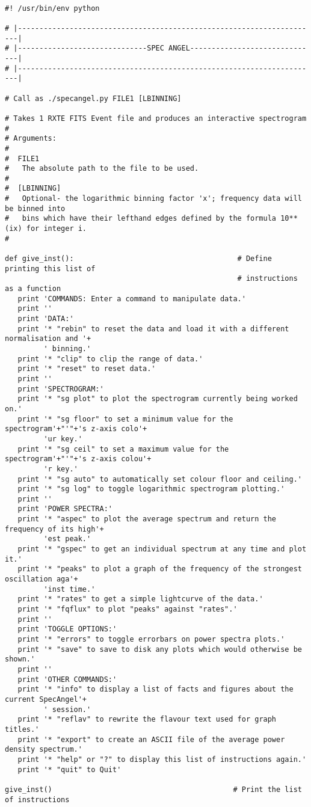 \begin{verbatim}

#! /usr/bin/env python

# |----------------------------------------------------------------------|
# |------------------------------SPEC ANGEL------------------------------|
# |----------------------------------------------------------------------|

# Call as ./specangel.py FILE1 [LBINNING]

# Takes 1 RXTE FITS Event file and produces an interactive spectrogram
#
# Arguments:
#
#  FILE1
#   The absolute path to the file to be used.
#
#  [LBINNING]
#   Optional- the logarithmic binning factor 'x'; frequency data will be binned into 
#   bins which have their lefthand edges defined by the formula 10**(ix) for integer i.
#

def give_inst():                                      # Define printing this list of
                                                      # instructions as a function
   print 'COMMANDS: Enter a command to manipulate data.'
   print ''
   print 'DATA:'
   print '* "rebin" to reset the data and load it with a different normalisation and '+
         ' binning.'
   print '* "clip" to clip the range of data.'
   print '* "reset" to reset data.'
   print ''
   print 'SPECTROGRAM:'
   print '* "sg plot" to plot the spectrogram currently being worked on.'
   print '* "sg floor" to set a minimum value for the spectrogram'+"'"+'s z-axis colo'+
         'ur key.'
   print '* "sg ceil" to set a maximum value for the spectrogram'+"'"+'s z-axis colou'+
         'r key.'
   print '* "sg auto" to automatically set colour floor and ceiling.'
   print '* "sg log" to toggle logarithmic spectrogram plotting.'
   print ''
   print 'POWER SPECTRA:'
   print '* "aspec" to plot the average spectrum and return the frequency of its high'+
         'est peak.'
   print '* "gspec" to get an individual spectrum at any time and plot it.'
   print '* "peaks" to plot a graph of the frequency of the strongest oscillation aga'+
         'inst time.'
   print '* "rates" to get a simple lightcurve of the data.'
   print '* "fqflux" to plot "peaks" against "rates".'
   print ''
   print 'TOGGLE OPTIONS:'
   print '* "errors" to toggle errorbars on power spectra plots.'
   print '* "save" to save to disk any plots which would otherwise be shown.'
   print ''
   print 'OTHER COMMANDS:'
   print '* "info" to display a list of facts and figures about the current SpecAngel'+
         ' session.'
   print '* "reflav" to rewrite the flavour text used for graph titles.'
   print '* "export" to create an ASCII file of the average power density spectrum.'
   print '* "help" or "?" to display this list of instructions again.'
   print '* "quit" to Quit'

give_inst()                                          # Print the list of instructions
\end{verbatim}

